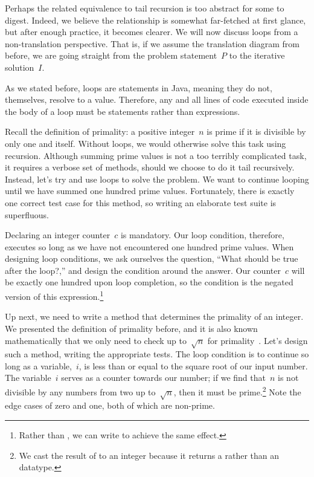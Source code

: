 Perhaps the related equivalence to tail recursion is too abstract for some to digest. 
Indeed, we believe the relationship is somewhat far-fetched at first glance, but after enough practice, it becomes clearer. 
We will now discuss loops from a non-translation perspective. 
That is, if we assume the translation diagram from before, we are going straight from the problem statement~$P$ to the iterative solution~$I$.

As we stated before, loops are statements in Java, meaning they do not, themselves, resolve to a value. 
Therefore, any and all lines of code executed inside the body of a loop must be statements rather than expressions.

Recall the definition of primality: a positive integer~$n$ is prime if it is divisible by only one and itself. 
Without loops, we would otherwise solve this task using recursion. 
Although summing prime values is not a too terribly complicated task, it requires a verbose set of methods, should we choose to do it tail recursively. 
Instead, let's try and use loops to solve the problem. 
We want to continue looping until we have summed one hundred prime values. 
Fortunately, there is exactly one correct test case for this method, so writing an elaborate test suite is superfluous.

Declaring an integer counter~$c$ is mandatory. 
Our loop condition, therefore, executes so long as we have not encountered one hundred prime values. 
When designing loop conditions, we ask ourselves the question, ``What should be true after the loop?,'' and design the condition around the answer. 
Our counter~$c$ will be exactly one hundred upon loop completion, so the condition is the negated version of this expression.\footnote{Rather than , we can write  to achieve the same effect.}

Up next, we need to write a method that determines the primality of an integer. 
We presented the definition of primality before, and it is also known mathematically that we only need to check up to~$\sqrt{n}$ for primality~\citep{riesel}. 
Let's design such a method, writing the appropriate tests. 
The loop condition is to continue so long as a variable,~$i$, is less than or equal to the square root of our input number. 
The variable~$i$ serves as a counter towards our number; if we find that~$n$ is not divisible by any numbers from two up to~$\sqrt{n}$, then it must be prime.\footnote{We cast the result of  to an integer because it returns a  rather than an  datatype.} 
Note the edge cases of zero and one, both of which are non-prime.

